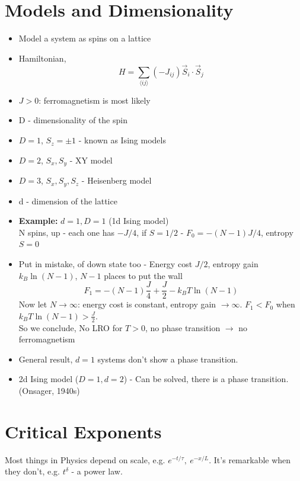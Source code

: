 \documentclass[a4paper, 11pt, normalem]{report}
\begin{document}
\section{Models and Dimensionality}
\begin{itemize}
    \item Model a system as spins on a lattice
    \item Hamiltonian, 
        \begin{equation}
            H = \sum_{\langle ij\rangle} \left(-J_{ij}\right) \vec{S}_i\cdot\vec{S}_j
        \end{equation}
    \item $J > 0$: ferromagnetism is most likely
    \item D - dimensionality of the spin
    \item $D=1$, $S_z = \pm 1$ - known as Ising models
    \item $D=2$, $S_x,S_y$ - XY model
    \item $D=3$, $S_x,S_y,S_z$ - Heisenberg model
    \item d - dimension of the lattice
    \item \textbf{Example: } $d=1,D=1$ (1d Ising model) \\
        N spins, up - each one has $-J/4$, if $S = 1/2$ - $F_0= -(N-1)J/4$, entropy $S=0$
    \item Put in mistake, of down state too - Energy cost $J/2$, entropy gain $k_B\ln(N-1)$, $N-1$ places to put the wall
        \begin{equation}
            F_1 = -(N-1)\frac{J}{4} + \frac{J}{2} - k_BT\ln(N-1)
        \end{equation}
        Now let $N \to \infty$: energy cost is constant, entropy gain $\to \infty$.
        $F_1 < F_0$ when $k_BT\ln(N-1) > \frac{J}{2}$. \\
        So we conclude, No LRO for $T > 0$, no phase transition $\to$ no ferromagnetism
    \item General result, $d=1$ systems don't show a phase transition. 
    \item 2d Ising model ($D=1,d=2$) - Can be solved, there is a phase transition. (Onsager, 1940s)
\end{itemize}

\section{Critical Exponents}
Most things in Physics depend on scale, e.g. $e^{-t/\tau},~e^{-x/L}$. It's remarkable when they don't, e.g. $t^\delta$ - a power law. 
\end{document}
